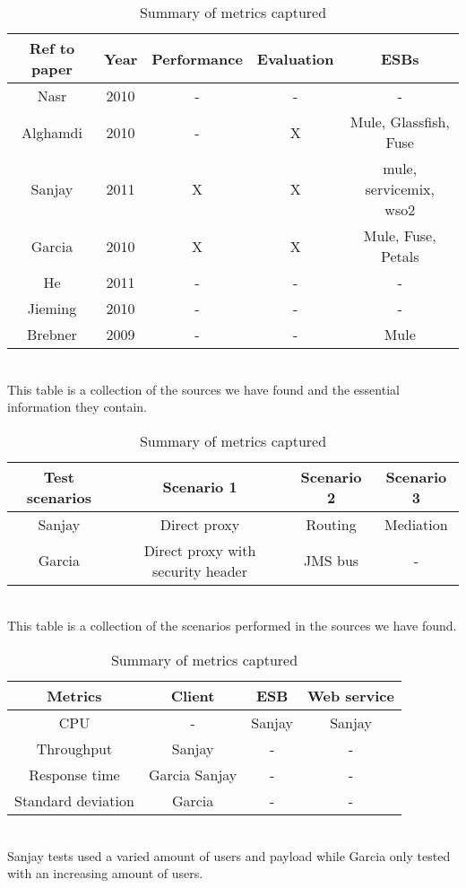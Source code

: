 \begin{table}
	\caption{Summary of academic papers and what test they perform}
	\begin{tabular}{c c c c c}

		Ref to paper & Year & Performance & Evaluation & ESBs \\ 
		\hline
		Nasr \cite{Nasr2010} & 2010 & - & - & - \\ 
		Alghamdi \cite{Alghamdi2010} & 2010 & - & X & Mule, Glassfish, Fuse\\
		Sanjay \cite{Sanjay2011} & 2011 & X & X & mule, servicemix, wso2 \\ 
		Garcia \cite{Garcia2010} & 2010 & X & X & Mule, Fuse, Petals \\
		He \cite{HeIntegration} & 2011 & - & - & -\\
		Jieming \cite{Jieming2010} & 2010 & - & - & - \\
		Brebner \cite{Brebner2009} & 2009 & - & - & Mule \\
		\hline
	\end{tabular}
	\\
	This table is a collection of the sources we have found and the essential information they contain.

	\caption{Summary of the scenarios in the academic performance tests}
	\begin{tabular}{c c c c}

		Test scenarios & Scenario 1 & Scenario 2 & Scenario 3 \\
		\hline
		Sanjay \cite{Sanjay2011} & Direct proxy & Routing & Mediation \\ 

		Garcia \cite{Garcia2010} & Direct proxy with security header & JMS bus & - \\ 
		\hline
	\end{tabular}
	\\
	This table is a collection of the scenarios performed in the sources we have found.
	
	\caption{Summary of metrics captured}
	\begin{tabular}{c c c c}
	Metrics &  Client & ESB & Web service \\
	\hline
	CPU & - & Sanjay \cite{Sanjay2011} & Sanjay \cite{Sanjay2011}\\
	Throughput & Sanjay \cite{Sanjay2011} & - & - \\
	Response time & Garcia \cite{Garcia2010} Sanjay \cite{Sanjay2011} & - & - \\
	Standard deviation & Garcia \cite{Garcia2010} & - & - \\
	\hline
	\end{tabular}
	\\
	Sanjay \cite{Sanjay2011} tests used a varied amount of users and payload while Garcia \cite{Garcia2010} only tested with an increasing amount of users.
\end{table}

